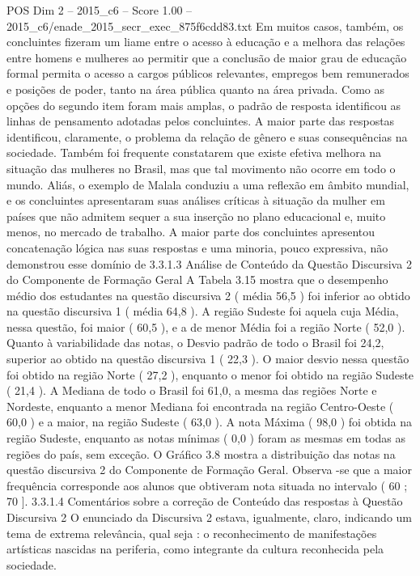 \begin{textsample}{POS Dim 2 – 2015\_c6 – Score 1.00 – 2015\_c6/enade\_2015\_secr\_exec\_875f6cdd83.txt}
Em muitos casos, também, os concluintes fizeram um liame entre o acesso à educação e a melhora das relações entre homens e mulheres ao permitir que a conclusão de maior grau de educação formal permita o acesso a cargos públicos relevantes, empregos bem remunerados e posições de poder, tanto na área pública quanto na área privada.
Como as opções do segundo item foram mais amplas, o padrão de resposta identificou as linhas de pensamento adotadas pelos concluintes.
A maior parte das respostas identificou, claramente, o problema da relação de gênero e suas consequências na sociedade.
Também foi frequente constatarem que existe efetiva melhora na situação das mulheres no Brasil, mas que tal movimento não ocorre em todo o mundo.
Aliás, o exemplo de Malala conduziu a uma reflexão em âmbito mundial, e os concluintes apresentaram suas análises críticas à situação da mulher em países que não admitem sequer a sua inserção no plano educacional e, muito menos, no mercado de trabalho.
A maior parte dos concluintes apresentou concatenação lógica nas suas respostas e uma minoria, pouco expressiva, não demonstrou esse domínio de 3.3.1.3 Análise de Conteúdo da Questão Discursiva 2 do Componente de Formação Geral A Tabela 3.15 mostra que o desempenho médio dos estudantes na questão discursiva 2 ( média 56,5 ) foi inferior ao obtido na questão discursiva 1 ( média 64,8 ).
A região Sudeste foi aquela cuja Média, nessa questão, foi maior ( 60,5 ), e a de menor Média foi a região Norte ( 52,0 ).
Quanto à variabilidade das notas, o Desvio padrão de todo o Brasil foi 24,2, superior ao obtido na questão discursiva 1 ( 22,3 ).
O maior desvio nessa questão foi obtido na região Norte ( 27,2 ), enquanto o menor foi obtido na região Sudeste ( 21,4 ).
A Mediana de todo o Brasil foi 61,0, a mesma das regiões Norte e Nordeste, enquanto a menor Mediana foi encontrada na região Centro-Oeste ( 60,0 ) e a maior, na região Sudeste ( 63,0 ).
A nota Máxima ( 98,0 ) foi obtida na região Sudeste, enquanto as notas mínimas ( 0,0 ) foram as mesmas em todas as regiões do país, sem exceção.
O Gráfico 3.8 mostra a distribuição das notas na questão discursiva 2 do Componente de Formação Geral.
Observa -se que a maior frequência corresponde aos alunos que obtiveram nota situada no intervalo ( 60 ; 70 ]. 3.3.1.4 Comentários sobre a correção de Conteúdo das respostas à Questão Discursiva 2 O enunciado da Discursiva 2 estava, igualmente, claro, indicando um tema de extrema relevância, qual seja : o reconhecimento de manifestações artísticas nascidas na periferia, como integrante da cultura reconhecida pela sociedade.

\end{textsample}
